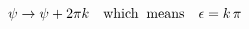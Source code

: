 \begin{equation}
\psi \rightarrow \psi + 2 \pi k \quad {\rm which \;\;means} \quad
\epsilon = k \, \pi
\end{equation}

